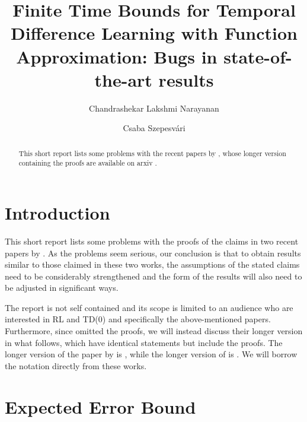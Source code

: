\documentclass{article}
\title{Finite Time Bounds for Temporal Difference Learning with Function Approximation: Bugs in state-of-the-art results}
\author{
Chandrashekar Lakshmi Narayanan
\and
Csaba Szepesv\'ari 
}
\begin{document}

\maketitle
\begin{abstract}
This short report lists some problems with the recent papers by \cite{flstd,lstdicml}, whose longer version containing the proofs are available on arxiv \citep{flstda,lstdicmla}.
\end{abstract}
\section{Introduction}
This short report lists some problems with the proofs of the claims in two recent papers  by \cite{flstd,lstdicml}.
As the problems seem serious, our conclusion is that to obtain results similar to those claimed in these two works, the assumptions of the stated claims need to be considerably strengthened and the form of the results will also need to be adjusted in significant ways.

The report is not self contained and its scope is limited to an audience who are interested in RL and TD(0) and specifically the above-mentioned papers.
Furthermore, since \cite{flstd,lstdicml} omitted the proofs, we will instead discuss their longer version in what follows, which have identical statements but include the proofs. The longer version of the paper by \cite{flstd} is \citep{flstda}, while the longer version
of \cite{lstdicml} is \citep{lstdicmla}.
We will  borrow the notation directly from these works.

\section{Expected Error Bound}
\end{document}

